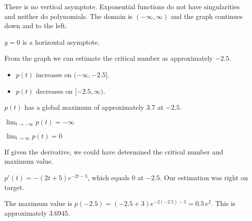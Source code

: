\documentclass{ximera}
\begin{document}
\begin{example}
\begin{image}
\end{image}




There is no vertical asymptote. Exponential functions do not have singularities and neither do polynomials.  The domain is $(-\infty, \infty)$ and the graph continues down and to the left.

$y = 0$ is a horizontal asymptote.

From the graph we can estimate the critical number as approximately $-2.5$.





\begin{itemize}
\item $p(t)$ increases on $(-\infty, -2.5]$.
\item $p(t)$ decreases on $[-2.5, \infty)$.
\end{itemize}


$p(t)$ has a global maximum of approximately $3.7$ at $-2.5$.


$\lim_{t \to -\infty} p(t) = -\infty$


$\lim_{t \to \infty} p(t) = 0$






\end{example}

If given the derivative, we could have determined the critical number and maximum value.


$p'(t) = -(2t+5) e^{-2t-3}$, which equals $0$ at $-2.5$.  Our estimation was right on target.  

The maximum value is $p(-2.5) = (-2.5+3)e^{-2(-2.5)-3} = 0.5 \, e^{2}$.  This is approximately $3.6945$.
\end{document}
